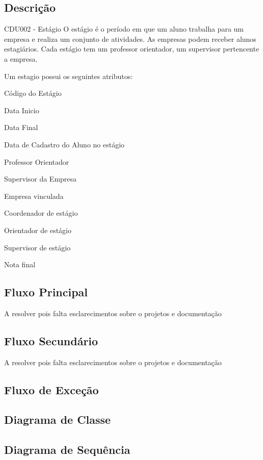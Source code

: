 \subsection{Descrição}
CDU002 - Estágio
    O estágio é o período em que um aluno trabalha para um empresa e realiza um 
conjunto de atividades. As empresas podem receber alunos estagiários. 
Cada estágio tem um professor orientador, um supervisor pertencente a empresa.

Um estagio possui os seguintes atributos:


Código do Estágio

Data Inicio

Data Final

Data de Cadastro do Aluno no estágio

Professor Orientador

Supervisor da Empresa	

Empresa vinculada	

Coordenador de estágio  	

Orientador de estágio
  		
Supervisor de estágio

Nota final


 



\subsection{Fluxo Principal}


A resolver pois falta esclarecimentos sobre o projetos e documentação

\subsection{Fluxo Secundário}

A resolver pois falta esclarecimentos sobre o projetos e documentação

\subsection{Fluxo de Exceção}

\subsection{Diagrama de Classe}

\subsection{Diagrama de Sequência}